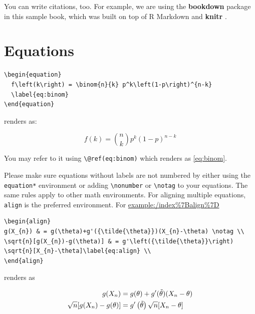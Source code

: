 \documentclass[
  oneside]{krantz}
\theoremstyle{definition}
\theoremstyle{definition}
\theoremstyle{definition}
\theoremstyle{remark}
\begin{document}
You can write citations, too. For example, we are using the \textbf{bookdown} package \citep{R-bookdown} in this sample book, which was built on top of R Markdown and \textbf{knitr} \citep{xie2015}.

\hypertarget{equations}{%
\section{Equations}\label{equations}}

\begin{verbatim}
\begin{equation} 
  f\left(k\right) = \binom{n}{k} p^k\left(1-p\right)^{n-k}
  \label{eq:binom}
\end{equation} 
\end{verbatim}

renders as:

\begin{equation} 
  f\left(k\right) = \binom{n}{k} p^k\left(1-p\right)^{n-k}
  \label{eq:binom}
\end{equation}

You may refer to it using \texttt{\textbackslash{}@ref(eq:binom)} which renders as \eqref{eq:binom}.

Please make sure equations  without labels are not numbered by either using the \texttt{equation*} environment or adding \texttt{\textbackslash{}nonumber} or \texttt{\textbackslash{}notag} to your equations. The same rules apply to other math environments. For aligning multiple equations, \texttt{align} is the preferred environment. For \url{example:/index\%7Balign\%7D}

\begin{verbatim}
\begin{align} 
g(X_{n}) & = g(\theta)+g'({\tilde{\theta}})(X_{n}-\theta) \notag \\
\sqrt{n}[g(X_{n})-g(\theta)] & = g'\left({\tilde{\theta}}\right) 
\sqrt{n}[X_{n}-\theta]\label{eq:align} \\
\end{align} 
\end{verbatim}

renders as

\begin{align} 
g(X_{n}) & = g(\theta)+g'({\tilde{\theta}})(X_{n}-\theta) \notag \\
\sqrt{n}[g(X_{n})-g(\theta)] & = g'\left({\tilde{\theta}}\right) 
\sqrt{n}[X_{n}-\theta]\label{eq:align} \\
\end{align}
\end{document}
